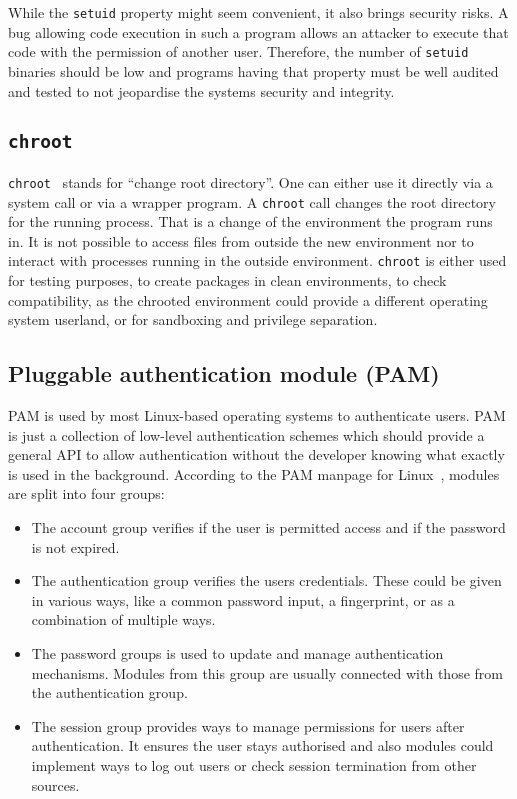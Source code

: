 While the \texttt{setuid} property might seem convenient, it also brings
security risks. A bug allowing code execution in such a program allows an
attacker to execute that code with the permission of another user. Therefore,
the number of \texttt{setuid} binaries should be low and programs having that
property must be well audited and tested to not jeopardise the
system\textquotesingle s security and integrity.

\subsection{\texttt{chroot}}

\texttt{chroot}~\cite{ogroupchroot} stands for ``change root directory''. One
can either use it directly via a system call or via a wrapper program. A
\texttt{chroot} call changes the root directory for the running process. That is
a change of the environment the program runs in. It is not possible to access
files from outside the new environment nor to interact with processes running in
the outside environment. \texttt{chroot} is either used for testing purposes, to
create packages in clean environments, to check compatibility, as the chrooted
environment could provide a different operating system userland, or for
sandboxing and privilege separation.

\subsection{Pluggable authentication module (PAM)}

PAM is used by most Linux-based operating systems to authenticate users. PAM is
just a collection of low-level authentication schemes which should provide a
general API to allow authentication without the developer knowing what exactly
is used in the background. According to the PAM manpage for Linux~\cite{pamman},
modules are split into four groups:

\begin{itemize}
\item The account group verifies if the user is permitted access and if the
password is not expired.
\item The authentication group verifies the user\textquotesingle s credentials.
These could be given in various ways, like a common password input, a
fingerprint, or as a combination of multiple ways.
\item The password groups is used to update and manage authentication
mechanisms. Modules from this group are usually connected with those from the
authentication group.
\item The session group provides ways to manage permissions for users after
authentication. It ensures the user stays authorised and also modules could
implement ways to log out users or check session termination from other sources.
\end{itemize}

